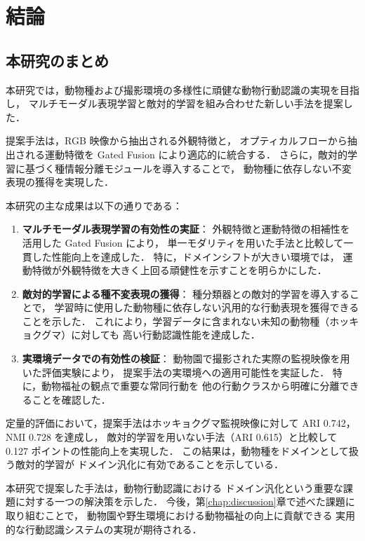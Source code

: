 \chapter{結論}
\label{chap:conclusion}

\section{本研究のまとめ}
本研究では，動物種および撮影環境の多様性に頑健な動物行動認識の実現を目指し，
マルチモーダル表現学習と敵対的学習を組み合わせた新しい手法を提案した．

提案手法は，RGB 映像から抽出される外観特徴と，
オプティカルフローから抽出される運動特徴を
Gated Fusion により適応的に統合する．
さらに，敵対的学習に基づく種情報分離モジュールを導入することで，
動物種に依存しない不変表現の獲得を実現した．

本研究の主な成果は以下の通りである：

\begin{enumerate}
  \item \textbf{マルチモーダル表現学習の有効性の実証}：
    外観特徴と運動特徴の相補性を活用した Gated Fusion により，
    単一モダリティを用いた手法と比較して一貫した性能向上を達成した．
    特に，ドメインシフトが大きい環境では，
    運動特徴が外観特徴を大きく上回る頑健性を示すことを明らかにした．

  \item \textbf{敵対的学習による種不変表現の獲得}：
    種分類器との敵対的学習を導入することで，
    学習時に使用した動物種に依存しない汎用的な行動表現を獲得できることを示した．
    これにより，学習データに含まれない未知の動物種（ホッキョクグマ）に対しても
    高い行動認識性能を達成した．

  \item \textbf{実環境データでの有効性の検証}：
    動物園で撮影された実際の監視映像を用いた評価実験により，
    提案手法の実環境への適用可能性を実証した．
    特に，動物福祉の観点で重要な常同行動を
    他の行動クラスから明確に分離できることを確認した．
\end{enumerate}

定量的評価において，提案手法はホッキョクグマ監視映像に対して
ARI 0.742，NMI 0.728 を達成し，
敵対的学習を用いない手法（ARI 0.615）と比較して
0.127 ポイントの性能向上を実現した．
この結果は，動物種をドメインとして扱う敵対的学習が
ドメイン汎化に有効であることを示している．




\vspace{1em}

本研究で提案した手法は，動物行動認識における
ドメイン汎化という重要な課題に対する一つの解決策を示した．
今後，第\ref{chap:discussion}章で述べた課題に取り組むことで，
動物園や野生環境における動物福祉の向上に貢献できる
実用的な行動認識システムの実現が期待される．
